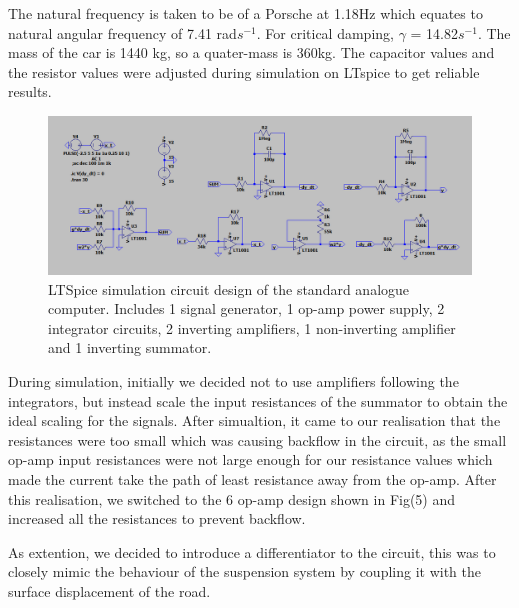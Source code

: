 \documentclass[journal]{Imperial_lab_report}
\begin{document}
 The natural frequency is taken to be of a Porsche at 1.18Hz which equates to natural angular frequency of 7.41 rad$s^{-1}$. For critical damping, $\gamma$ = 14.82$s^{-1}$. The mass of the car is 1440 kg, so a quater-mass is 360kg. The capacitor values and the resistor values were adjusted during simulation on LTspice to get reliable results. 

 \begin{figure}[h]
    \centering
    \includegraphics[scale = 0.3]{final_sim_default.PNG}
    \caption{LTSpice simulation circuit design of the standard analogue computer. Includes 1 signal generator, 1 op-amp power supply, 2 integrator circuits, 2 inverting amplifiers, 1 non-inverting amplifier and 1 inverting summator.}
 \end{figure}

During simulation, initially we decided not to use amplifiers following the integrators, but instead scale the input resistances of the summator to obtain the ideal scaling for the signals. After simualtion, it came to our realisation that the resistances were too small which was causing backflow in the circuit, as the small op-amp input resistances were not large enough for our resistance values which made the current take the path of least resistance away from the op-amp. After this realisation, we switched to the 6 op-amp design shown in Fig(5) and increased all the resistances to prevent backflow. 

As extention, we decided to introduce a differentiator to the circuit, this was to closely mimic the behaviour of the suspension system by coupling it with the surface displacement of the road.
\end{document}
